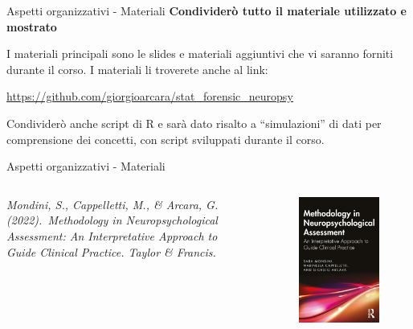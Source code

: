 \documentclass[
  ignorenonframetext,
]{beamer}
\begin{document}
\begin{frame}{Aspetti organizzativi - Materiali}
\label{aspetti-organizzativi---materiali}
\textbf{Condividerò tutto il materiale utilizzato e mostrato}

I materiali principali sono le slides e materiali aggiuntivi che vi
saranno forniti durante il corso. I materiali li troverete anche al
link:

\href{\%5Bhttps://github.com/giorgioarcara/stat_forensic_neuropsy}{\ul{https://github.com/giorgioarcara/stat\_forensic\_neuropsy}}

Condividerò anche script di R e sarà dato risalto a ``simulazioni'' di
dati per comprensione dei concetti, con script sviluppati durante il
corso.
\end{frame}

\begin{frame}{Aspetti organizzativi - Materiali}
\label{aspetti-organizzativi---materiali-1}
\begin{columns}

\emph{Mondini, S., Cappelletti, M., \& Arcara, G. (2022). Methodology in Neuropsychological Assessment: An Interpretative Approach to Guide Clinical Practice. Taylor \& Francis.}


\begin{figure}
\includegraphics[scale=0.5]{Figures/Methodology_book.png}
\end{figure}

\end{columns}
\end{frame}
\end{document}
